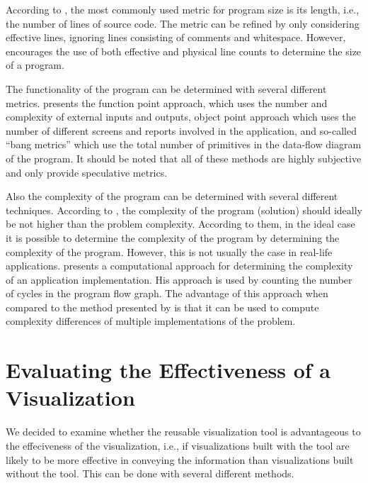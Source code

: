 According to \citet{fenton_software_1998}, the most commonly used metric for program size is its length, i.e., the number of lines of source code. The metric can be refined by only considering effective lines, ignoring lines consisting of comments and whitespace. However, \citet{fenton_software_1998} encourages the use of both effective and physical line counts to determine the size of a program.

The functionality of the program can be determined with several different metrics. \citet{fenton_software_1998} presents the function point approach, which uses the number and complexity of external inputs and outputs, object point approach which uses the number of different screens and reports involved in the application, and so-called ``bang metrics'' which use the total number of primitives in the data-flow diagram of the program. It should be noted that all of these methods are highly subjective and only provide speculative metrics.

Also the complexity of the program can be determined with several different techniques. According to \citet{fenton_software_1998}, the complexity of the program (solution) should ideally be not higher than the problem complexity. According to them, in the ideal case it is possible to determine the complexity of the program by determining the complexity of the program. However, this is not usually the case in real-life applications. \citet{mccabe_complexity_1976} presents a computational approach for determining the complexity of an application implementation. His approach is used by counting the number of cycles in the program flow graph. The advantage of this approach when compared to the method presented by \citet{fenton_software_1998} is that it can be used to compute complexity differences of multiple implementations of the problem.


\section{Evaluating the Effectiveness of a Visualization}

We decided to examine whether the reusable visualization tool is advantageous to the effeciveness of the visualization, i.e., if visualizations built with the tool are likely to be more effective in conveying the information than visualizations built without the tool. This can be done with several different methods. 

